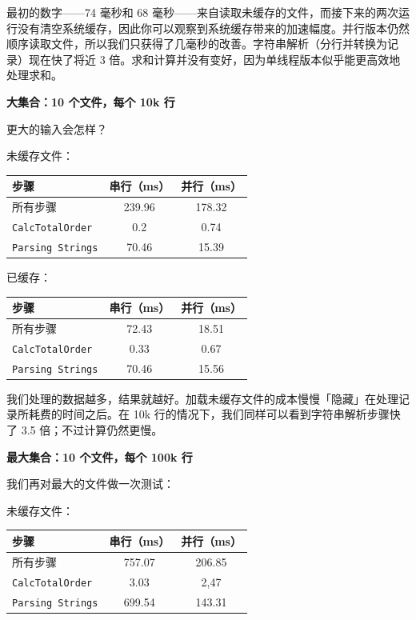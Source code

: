 最初的数字——74 毫秒和 68 毫秒——来自读取未缓存的文件，而接下来的两次运行没有清空系统缓存，因此你可以观察到系统缓存带来的加速幅度。并行版本仍然顺序读取文件，所以我们只获得了几毫秒的改善。字符串解析（分行并转换为记录）现在快了将近 3 倍。求和计算并没有变好，因为单线程版本似乎能更高效地处理求和。

\textbf{大集合：10 个文件，每个 10k 行}

更大的输入会怎样？

未缓存文件：

\begin{table}[H]
\centering
\begin{tabularx}{\textwidth}{X c c}
\toprule
步骤 & 串行（ms） & 并行（ms） \\
\midrule
所有步骤 & 239.96 & 178.32 \\
\texttt{CalcTotalOrder} & 0.2 & 0.74 \\
\texttt{Parsing Strings} & 70.46 & 15.39 \\
\bottomrule
\end{tabularx}
\end{table}

已缓存：

\begin{table}[H]
\centering
\begin{tabularx}{\textwidth}{X c c}
\toprule
步骤 & 串行（ms） & 并行（ms） \\
\midrule
所有步骤 & 72.43 & 18.51 \\
\texttt{CalcTotalOrder} & 0.33 & 0.67 \\
\texttt{Parsing Strings} & 70.46 & 15.56 \\
\bottomrule
\end{tabularx}
\end{table}

我们处理的数据越多，结果就越好。加载未缓存文件的成本慢慢「隐藏」在处理记录所耗费的时间之后。在 10k 行的情况下，我们同样可以看到字符串解析步骤快了 3.5 倍；不过计算仍然更慢。

\textbf{最大集合：10 个文件，每个 100k 行}

我们再对最大的文件做一次测试：

未缓存文件：

\begin{table}[H]
\centering
\begin{tabularx}{\textwidth}{X c c}
\toprule
步骤 & 串行（ms） & 并行（ms） \\
\midrule
所有步骤 & 757.07 & 206.85 \\
\texttt{CalcTotalOrder} & 3.03 & 2,47 \\
\texttt{Parsing Strings} & 699.54 & 143.31 \\
\bottomrule
\end{tabularx}
\end{table}

